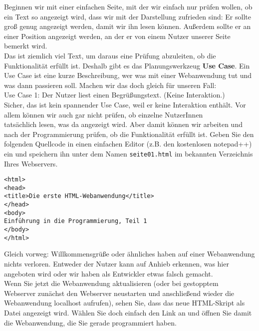 Beginnen wir mit einer einfachen Seite, mit der wir einfach nur prüfen wollen, ob ein Text so angezeigt wird, dass wir mit der Darstellung zufrieden sind: Er sollte groß genug angezeigt werden, damit wir ihn lesen können. Außerdem sollte er an einer Position angezeigt werden, an der er von einem Nutzer unserer Seite bemerkt wird.\\

Das ist ziemlich viel Text, um daraus eine Prüfung abzuleiten, ob die Funktionalität erfüllt ist. Deshalb gibt es das Planungswerkzeug \textbf{Use Case}. Ein Use Case ist eine kurze Beschreibung, wer was mit einer Webanwendung tut und was dann passieren soll. Machen wir das doch gleich für unseren Fall:\\

Use Case 1: Der Nutzer liest einen Begrüßungstext. (Keine Interaktion.)\\

Sicher, das ist kein spannender Use Case, weil er keine Interaktion enthält. Vor allem können wir auch gar nicht prüfen, ob einzelne NutzerInnen\\tatsächlich lesen, was da angezeigt wird. Aber damit können wir arbeiten und nach der Programmierung prüfen, ob die Funktionalität erfüllt ist. Geben Sie den folgenden Quellcode in einen einfachen Editor (z.B. den kostenlosen notepad++) ein und speichern ihn unter dem Namen \verb|seite01.html| im bekannten Verzeichnis Ihres Webservers.

\begin{verbatim}
<html>
<head>
<title>Die erste HTML-Webanwendung</title>
</head>
<body>
Einführung in die Programmierung, Teil 1
</body>
</html>
\end{verbatim}

Gleich vorweg: Willkommensgrüße oder ähnliches haben auf einer Webanwendung nichts verloren. Entweder der Nutzer kann auf Anhieb erkennen, was hier angeboten wird oder wir haben als Entwickler etwas falsch gemacht.\\

Wenn Sie jetzt die Webanwendung aktualisieren (oder bei gestopptem\\Webserver zunächst den Webserver neustarten und anschließend wieder die Webanwendung localhost aufrufen), sehen Sie, dass das neue HTML-Skript als Datei angezeigt wird. Wählen Sie doch einfach den \glqq{}Link\grqq{} an und öffnen Sie damit die Webanwendung, die Sie gerade programmiert haben.\\

